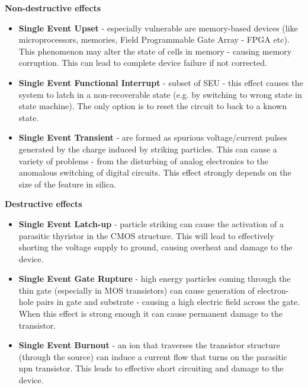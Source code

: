         \bigskip\textbf{Non-destructive effects}
        \begin{itemize}
            \item \textbf{Single Event Upset} - especially vulnerable are memory-based devices (like microprocessors, memories, Field Programmable Gate Array - FPGA etc). This phenomenon may alter the state of cells in memory - causing memory corruption. This can lead to complete device failure if not corrected.

            \item \textbf{Single Event Functional Interrupt} - subset of SEU - this effect causes the system to latch in a non-recoverable state (e.g. by switching to wrong state in state machine). The only option is to reset the circuit to back to a known state.

            \item \textbf{Single Event Transient} - are formed as spurious voltage/current pulses generated by the charge induced by striking particles. This can cause a variety of problems - from the disturbing of analog electronics to the anomalous switching of digital circuits. This effect strongly depends on the size of the feature in silica.
        \end{itemize}

        \bigskip\textbf{Destructive effects}
        \begin{itemize}
            \item \textbf{Single Event Latch-up} - particle striking can cause the activation of a parasitic thyristor in the CMOS structure. This will lead to effectively shorting the voltage supply to ground, causing overheat and damage to the device.

            \item \textbf{Single Event Gate Rupture} - high energy particles coming through the thin gate (especially in MOS transistors) can cause generation of electron-hole pairs in gate and substrate - causing a high electric field across the gate. When this effect is strong enough it can cause permanent damage to the transistor.

            \item \textbf{Single Event Burnout} - an ion that traverses the transistor structure (through the source) can induce a current flow that turns on the parasitic npn transistor. This leads to effective short circuiting and damage to the device.
        \end{itemize}

